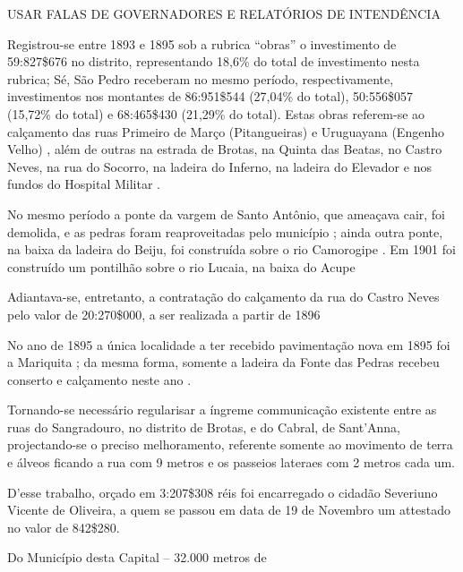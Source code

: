 USAR FALAS DE GOVERNADORES E RELATÓRIOS DE INTENDÊNCIA

Registrou-se entre 1893 e 1895 sob a rubrica ``obras'' o investimento de 59:827\$676 no distrito, representando 18,6\% do total de investimento nesta rubrica; Sé, São Pedro receberam no mesmo período, respectivamente, investimentos nos montantes de 86:951\$544 (27,04\% do total), 50:556\$057 (15,72\% do total) e 68:465\$430 (21,29\% do total). Estas obras referem-se ao calçamento das ruas Primeiro de Março (Pitangueiras) e Uruguayana (Engenho Velho) \cite[pp.~21-23, 138]{salvador_relatorio_1896}, além de outras na estrada de Brotas, na Quinta das Beatas, no Castro Neves, na rua do Socorro, na ladeira do Inferno, na ladeira do Elevador e nos fundos do Hospital Militar \cite[p.~157]{salvador_relatorio_1894}.

No mesmo período a ponte da vargem de Santo Antônio, que ameaçava cair, foi demolida, e as pedras foram reaproveitadas pelo município \cite[p.~137]{salvador_relatorio_1896}; ainda outra ponte, na baixa da ladeira do Beiju, foi construída sobre o rio Camorogipe \cite[p.~156]{salvador_relatorio_1894}. Em 1901 foi construído um pontilhão sobre o rio Lucaia, na baixa do Acupe 

Adiantava-se, entretanto, a contratação do calçamento da rua do Castro Neves pelo valor de 20:270\$000, a ser realizada a partir de 1896 \cite[p.~23]{salvador_relatorio_1896}

No ano de 1895 a única localidade a ter recebido pavimentação nova em 1895 foi a Mariquita \cite[p.~16]{salvador_relatorio_1896}; da mesma forma, somente a ladeira da Fonte das Pedras recebeu conserto e calçamento neste ano \cite[p.~16]{salvador_relatorio_1896}. 



\begin{citacao}
Tornando-se necessário regularisar a íngreme communicação existente entre as ruas do Sangradouro, no distrito de Brotas, e do Cabral, de Sant'Anna, projectando-se o preciso melhoramento, referente somente ao movimento de terra e álveos ficando a rua com 9 metros e os passeios lateraes com 2 metros cada um.

D'esse trabalho, orçado em 3:207\$308 réis foi encarregado o cidadão Severiuno Vicente de Oliveira, a quem se passou em data de 19 de Novembro um attestado no valor de 842\$280.
\end{citacao}

\begin{citacao}
Do Município desta Capital -- 32.000 metros de 
\end{citacao}








